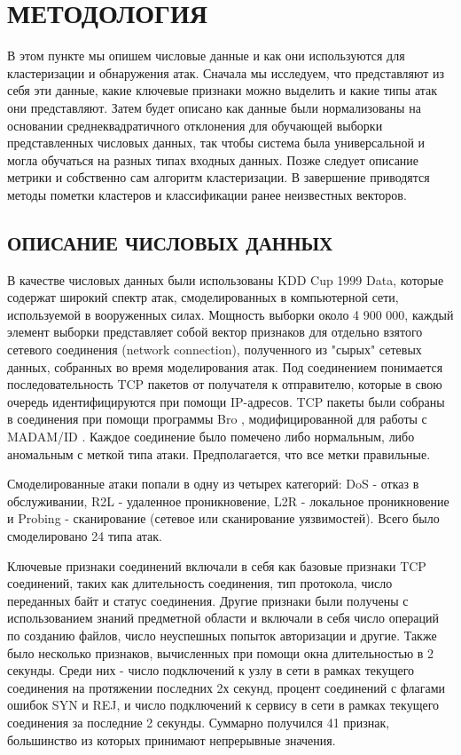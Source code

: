 \documentclass[12pt,a4paper]{article}
\begin{document}
\section{МЕТОДОЛОГИЯ}

В этом пункте мы опишем числовые данные и как они используются для кластеризации и 
обнаружения атак. Сначала мы исследуем, что представляют из себя эти данные, какие
ключевые признаки можно выделить и какие типы атак они представляют. Затем будет
описано как данные были нормализованы на основании среднеквадратичного отклонения
для обучающей выборки представленных числовых данных, так чтобы система была универсальной
и могла обучаться на разных типах входных данных. Позже следует описание метрики и 
собственно сам алгоритм кластеризации. В завершение приводятся методы пометки кластеров
и классификации ранее неизвестных векторов.

\subsection{ОПИСАНИЕ ЧИСЛОВЫХ ДАННЫХ}
В качестве числовых данных были использованы KDD Cup 1999 Data, которые содержат
широкий спектр атак, смоделированных в компьютерной сети, используемой в вооруженных
силах. Мощность выборки около 4 900 000, каждый элемент выборки представляет собой
вектор признаков для отдельно взятого сетевого соединения (network connection),
полученного из "сырых" сетевых данных, собранных во время моделирования атак.
Под соединением понимается последовательность TCP пакетов от получателя к отправителю,
которые в свою очередь идентифицируются при помощи IP-адресов. TCP пакеты были собраны
в соединения при помощи программы Bro \cite{bib:bro}, модифицированной для работы с
MADAM/ID \cite{bib:madamid}. Каждое соединение было помечено либо нормальным, либо
аномальным с меткой типа атаки. Предполагается, что все метки правильные.

Смоделированные атаки попали в одну из четырех категорий: DoS - отказ в обслуживании,
R2L - удаленное проникновение, L2R - локальное проникновение и Probing - сканирование
(сетевое или сканирование уязвимостей). Всего было смоделировано 24 типа атак.

Ключевые признаки соединений включали в себя как базовые признаки TCP соединений, таких
как длительность соединения, тип протокола, число переданных байт и статус соединения.
Другие признаки были получены с использованием знаний предметной области и включали в себя
число операций по созданию файлов, число неуспешных попыток авторизации и другие. Также
было несколько признаков, вычисленных при помощи окна длительностью в 2 секунды. Среди них -
число подключений к узлу в сети в рамках текущего соединения на протяжении последних 2х секунд,
процент соединений с флагами ошибок SYN и REJ, и число подключений к сервису в сети в рамках
текущего соединения за последние 2 секунды. Суммарно получился 41 признак, большинство из которых
принимают непрерывные значения.
\end{document}
